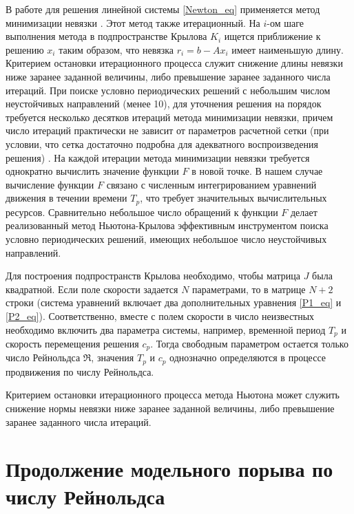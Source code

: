В работе для решения линейной системы \eqref{Newton_eq} применяется метод минимизации невязки \cite{EEbook}. Этот метод также итерационный. На $i$-ом шаге выполнения метода в подпространстве Крылова $K_i$ ищется приближение к решению $x_i$ таким образом, что невязка $r_i = b - Ax_i$ имеет наименьшую длину. Критерием остановки итерационного процесса служит снижение длины невязки ниже заранее заданной величины, либо превышение заранее заданного числа итераций. При поиске условно периодических решений с небольшим числом неустойчивых направлений (менее 10), для уточнения решения на порядок требуется несколько десятков итераций метода минимизации невязки, причем число итераций  практически не зависит от параметров расчетной сетки (при условии, что сетка достаточно подробна для адекватного воспроизведения решения) \cite{Dijkstra2014}. На каждой итерации метода минимизации невязки требуется однократно вычислить значение функции $F$ в новой точке. В нашем случае вычисление функции $F$ связано с численным интегрированием уравнений движения в течении времени $T_p$, что требует значительных вычислительных ресурсов. Сравнительно небольшое число обращений к функции $F$ делает реализованный метод Ньютона-Крылова эффективным инструментом поиска условно периодических решений, имеющих небольшое число неустойчивых направлений.

Для построения подпространств Крылова необходимо, чтобы матрица $J$ была квадратной. Если поле скорости задается $N$ параметрами, то в матрице $N+2$ строки (система уравнений включает два дополнительных уравнения \eqref{P1_eq} и \eqref{P2_eq}). Соответственно, вместе с полем скорости в число неизвестных необходимо включить два параметра системы, например, временной период $T_p$ и скорость перемещения решения $c_p$. Тогда свободным параметром остается только число Рейнольдса $\Re$, значения $T_p$ и $c_p$ однозначно определяются в процессе продвижения по числу Рейнольдса. 

Критерием остановки итерационного процесса метода Ньютона может служить снижение нормы невязки ниже заранее заданной величины, либо превышение заранее заданного числа итераций. 

\section{Продолжение модельного порыва по числу Рейнольдса} \label{contin_sec}


